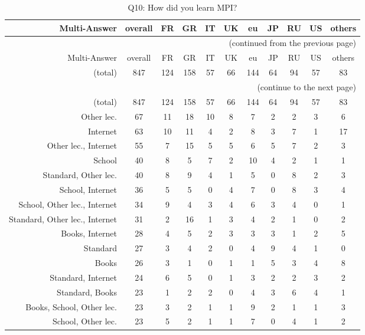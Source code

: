 \clearpage%
{\footnotesize\begin{landscape}%
\begin{longtable}[htb]{r|c|c|c|c|c|c|c|c|c|c}%
\caption{Q10: How did you learn MPI?}%
\label{tab:Q10-mans} \\%
\hline%
Multi-Answer & overall & FR & GR & IT & UK & eu & JP & RU & US & others \\
 \hline%
\endfirsthead%
\multicolumn{11}{r}{(continued from the previous page)}\\%
\hline%
Multi-Answer & overall & FR & GR & IT & UK & eu & JP & RU & US & others \\
 \hline%
\endhead%
\hline%
(total) & 847 & 124 & 158 & 57 & 66 & 144 & 64 & 94 & 57 & 83 \\%
\hline%
\multicolumn{11}{r}{(continue to the next page)}\\%
\endfoot%
\hline%
(total) & 847 & 124 & 158 & 57 & 66 & 144 & 64 & 94 & 57 & 83 \\%
\hline%
\endlastfoot%
\hline%
{Other lec.} & 67 & 11 & 18 & 10 & 8 & 7 & 2 & 2 & 3 & 6 \\%
{Internet} & 63 & 10 & 11 & 4 & 2 & 8 & 3 & 7 & 1 & 17 \\%
{Other lec., Internet} & 55 & 7 & 15 & 5 & 5 & 6 & 5 & 7 & 2 & 3 \\%
{School} & 40 & 8 & 5 & 7 & 2 & 10 & 4 & 2 & 1 & 1 \\%
{Standard, Other lec.} & 40 & 8 & 9 & 4 & 1 & 5 & 0 & 8 & 2 & 3 \\%
{School, Internet} & 36 & 5 & 5 & 0 & 4 & 7 & 0 & 8 & 3 & 4 \\%
{School, Other lec., Internet} & 34 & 9 & 4 & 3 & 4 & 6 & 3 & 4 & 0 & 1 \\%
{Standard, Other lec., Internet} & 31 & 2 & 16 & 1 & 3 & 4 & 2 & 1 & 0 & 2 \\%
{Books, Internet} & 28 & 4 & 5 & 2 & 3 & 3 & 3 & 1 & 2 & 5 \\%
{Standard} & 27 & 3 & 4 & 2 & 0 & 4 & 9 & 4 & 1 & 0 \\%
{Books} & 26 & 3 & 1 & 0 & 1 & 1 & 5 & 3 & 4 & 8 \\%
{Standard, Internet} & 24 & 6 & 5 & 0 & 1 & 3 & 2 & 2 & 3 & 2 \\%
{Standard, Books} & 23 & 1 & 2 & 2 & 0 & 4 & 3 & 6 & 4 & 1 \\%
{Books, School, Other lec.} & 23 & 3 & 2 & 1 & 1 & 9 & 2 & 1 & 1 & 3 \\%
{School, Other lec.} & 23 & 5 & 2 & 1 & 1 & 7 & 0 & 4 & 1 & 2 \\%

\end{longtable}
\end{landscape}}
